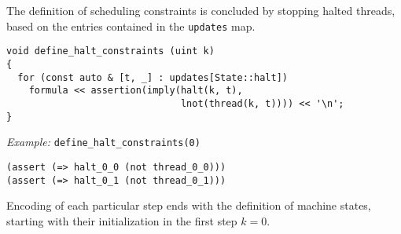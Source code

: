 
%
%

\noindent
The definition of scheduling constraints is concluded by stopping halted threads, based on the entries contained in the \texttt{updates} map.

\begin{lstlisting}[style=c++]
void define_halt_constraints (uint k)
{
  for (const auto & [t, _] : updates[State::halt])
    formula << assertion(imply(halt(k, t),
                               lnot(thread(k, t)))) << '\n';
}
\end{lstlisting}


\noindent
\emph{Example:} \lstinline[style=c++]{define_halt_constraints(0)}

\begin{lstlisting}[language=smtlib]
(assert (=> halt_0_0 (not thread_0_0)))
(assert (=> halt_0_1 (not thread_0_1)))
\end{lstlisting}


\noindent
Encoding of each particular step ends with the definition of machine states,
starting with their initialization in the first step $k = 0$.

